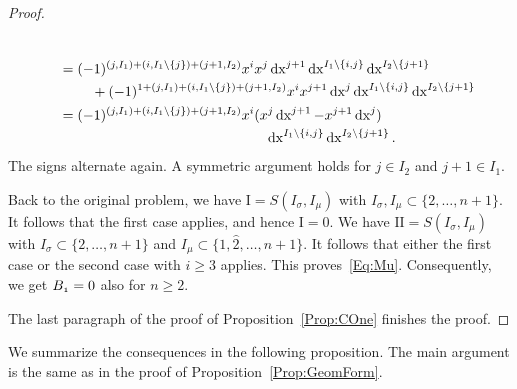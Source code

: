 \documentclass[\MainFolder/Text.tex]{subfiles}
\begin{document}
\begin{proof}
\begin{description}[font=\normalfont\itshape]
\begin{align*}
\begin{multlined}[t]
\end{multlined}\\&\quad=
\begin{multlined}[t]
(-1)^{(j,I_1) + (i,I_1\backslash\{j\})+(j+1,I_2)} x^i x^j \Diff{x}^{j+1} \Diff{x}^{I_1\backslash\{i,j\}} \Diff{x}^{I_2\backslash\{j+1\}} \\ {}+ (-1)^{1 + (j,I_1) + (i,I_1\backslash\{j\})+(j+1,I_2)} x^i x^{j+1} \Diff{x}^j \Diff{x}^{I_1\backslash\{i,j\}} \Diff{x}^{I_2\backslash\{j+1\}} 
\end{multlined}\\
&\quad= \begin{multlined}[t] (-1)^{(j,I_1) + (i,I_1\backslash\{j\})+(j+1,I_2)} x^i (x^j \Diff{x}^{j+1} - x^{j+1} \Diff{x}^j) \\ \Diff{x}^{I_1\backslash\{i,j\}} \Diff{x}^{I_2\backslash\{j+1\}}. \end{multlined}
\end{align*}
The signs alternate again. A symmetric argument holds for $j\in I_2$ and $j+1\in I_1$.
\end{description}	 

 Back to the original problem, we have $\mathrm{I} = S(I_\sigma, I_\mu)$ with $I_\sigma, I_\mu \subset \{2,\dotsc, n+1\}$. It follows that the first case applies, and hence $\mathrm{I} = 0$.  We have $\mathrm{II} = S(I_\sigma, I_\mu)$ with $I_\sigma \subset \{2,\dotsc, n+1\}$ and $I_\mu \subset \{1, \widehat{2}, \dotsc, n+1\}$. It follows that either the first case or the second case with $i\ge 3$ applies. This proves~\eqref{Eq:Mu}. Consequently, we get $B_{\NOne} = 0$ also for $n\ge 2$.
 
The last paragraph of the proof of Proposition~\ref{Prop:COne} finishes the proof.
\end{proof}

We summarize the consequences in the following proposition. The main argument is the same as in the proof of Proposition~\eqref{Prop:GeomForm}.
\end{document}

